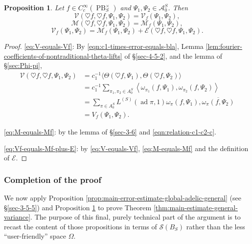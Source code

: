 \documentclass[reqno,10pt]{amsart}
\theoremstyle{plain} %
\theoremstyle{definition}
\theoremstyle{plain} %
\newtheorem{proposition} {Proposition}
\theoremstyle{remark}
\theoremstyle{itplain} %
\theoremstyle{remark} %
\numberwithin{equation}{section}
\DeclareMathOperator{\ad}{ad}
\def\PB{\operatorname{PB}}
\begin{document}
\begin{proposition}\label{prop:after-extracting-main-term}
  Let $f \in C_c^\infty(\PB^\times_S)$ and $\Psi_1,\Psi_2 \in \mathcal{A}_0^S$.  Then
  \begin{equation}\label{eq:V-equals-Vf}
    \mathcal{V}(\heartsuit f,\heartsuit f,\Psi_1,\Psi_2)
    = \mathcal{V}_f(\Psi_1,\Psi_2),
  \end{equation}
  \begin{equation}\label{eq:M-equals-Mf}
    \mathcal{M}(\heartsuit f,\heartsuit f,\Psi_1,\Psi_2)
    = \mathcal{M}_f(\Psi_1,\Psi_2),
  \end{equation}
  \begin{equation}\label{eq:Vf-equals-Mf-plus-E}
    \mathcal{V}_f(\Psi_1,\Psi_2)
    =
    \mathcal{M}_f(\Psi_1,\Psi_2)
    +
    \mathcal{E}(\heartsuit f, \heartsuit f,
    \Psi_1, \Psi_2).
  \end{equation}
\end{proposition}
\begin{proof}
  \eqref{eq:V-equals-Vf}: By \eqref{eqn:c1-times-error-equals-bla}, Lemma \ref{lem:fourier-coefficients-of-nontraditional-theta-lifts} of \S\ref{sec-4-5-2}, and the lemma of \S\ref{sec:Phi-pi},
  \begin{align*}
    \mathcal{V}(\heartsuit f,\heartsuit f,\Psi_1,\Psi_2)
    &=
      c_1^{-1} \langle   \Theta(\heartsuit f, \Psi_1),   \Theta(\heartsuit f,
      \Psi_2) \rangle
    \\
    &=
      c_1^{-1} \sum_{\pi_1,\pi_2 \in A_0^S}
      \left\langle
      \omega_{\pi_1}(f, \Psi_1),
      \omega_{\pi_2}(f, \Psi_2)
      \right\rangle
    \\
    &=
      \sum_{\pi \in A_0^S}
      L^{(S)}(\ad \pi,1)
      \omega_{\pi}( f, \Psi_1),
      \overline{\omega_{\pi}( f, \Psi_2)}
    \\
    &=
      V_f(\Psi_1,\Psi_2).
  \end{align*}

  \eqref{eq:M-equals-Mf}: by the lemma of \S\ref{sec-3-6} and \eqref{eqn:relation-c1-c2-c}.

  \eqref{eq:Vf-equals-Mf-plus-E}: by \eqref{eq:V-equals-Vf}, \eqref{eq:M-equals-Mf} and the definition of $\mathcal{E}$.
\end{proof}







\subsubsection{Completion of the proof}
\label{sec-4-5-5}
We now apply Proposition \ref{prop:main-error-estimate-global-adelic-general} (see \S\ref{sec-3-5-5}) and Proposition \ref{prop:after-extracting-main-term} to prove Theorem \ref{thm:main-estimate-general-variance}.  The purpose
of this final, purely technical part of the argument is to recast the content of those propositions in terms of $\mathcal{S}(B_S)$ rather than the less ``user-friendly'' space $\Omega$.
\end{document}
